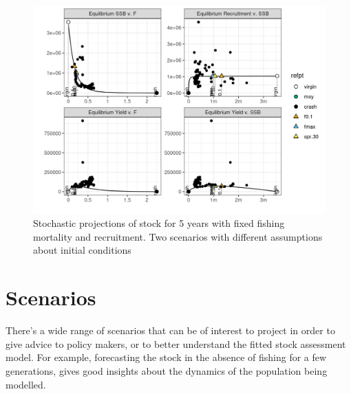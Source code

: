 \documentclass[
]{book}
\begin{document}
\begin{figure}
\centering
\includegraphics{_bookdown_files/_main_files/figure-html/unnamed-chunk-104-1.png}
\caption{\label{fig:unnamed-chunk-104}Stochastic projections of stock for 5 years with fixed fishing mortality and recruitment. Two scenarios with different assumptions about initial conditions}
\end{figure}

\hypertarget{scenarios}{%
\section{Scenarios}\label{scenarios}}

There's a wide range of scenarios that can be of interest to project in order to give advice to policy makers, or to better understand the fitted stock assessment model. For example, forecasting the stock in the absence of fishing for a few generations, gives good insights about the dynamics of the population being modelled.
\end{document}
